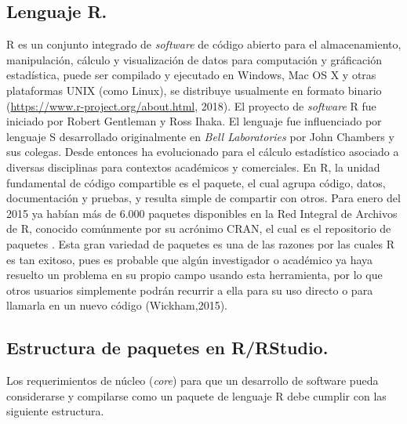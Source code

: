 \subsection{Lenguaje R.}

R es un conjunto integrado de \textit{software} de código abierto para el almacenamiento, manipulación, cálculo y visualización de datos para computación y gráficación estadística, puede ser compilado y ejecutado en Windows, Mac OS X y otras plataformas UNIX (como Linux), se distribuye usualmente en formato binario (\url{https://www.r-project.org/about.html}, 2018). El proyecto de \emph{software} R fue iniciado por Robert Gentleman y Ross Ihaka. El lenguaje fue influenciado por  lenguaje S desarrollado originalmente en \textit{Bell Laboratories} por John Chambers y sus colegas. Desde entonces ha evolucionado  para el cálculo estadístico asociado a diversas disciplinas para contextos académicos y comerciales. En R, la unidad fundamental de código compartible es el paquete, el cual agrupa código, datos, documentación y pruebas, y resulta simple de compartir con otros. Para enero del 2015 ya habían más de 6.000 paquetes disponibles en la Red Integral de Archivos de R, conocido comúnmente por su acrónimo CRAN, el cual es el repositorio de paquetes . Esta gran variedad de paquetes es una de las razones por las cuales R es tan exitoso, pues es probable que algún investigador o académico ya haya resuelto un problema en su propio campo usando esta herramienta, por lo que otros usuarios simplemente podrán recurrir a ella para su uso directo o para llamarla en un nuevo código (Wickham,2015). \\

\subsection{Estructura de paquetes en R/RStudio.}

Los requerimientos de núcleo (\textit{core}) para que un desarrollo de software pueda considerarse y compilarse como un paquete de lenguaje R debe cumplir con las siguiente estructura.\\

